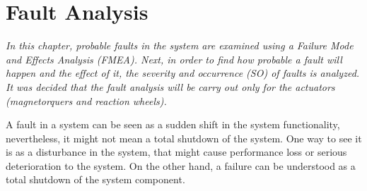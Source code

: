 \chapter{Fault  Analysis }
\textit{In this chapter, probable faults in the system are examined using a  Failure Mode and Effects Analysis (FMEA). Next, in order to find how probable a fault will happen and the effect of it, the severity and occurrence (SO)  of faults is analyzed. It was decided that the fault analysis will be carry out only for the actuators (magnetorquers and reaction wheels).}


A fault in a system can be seen as a sudden shift in the system functionality, nevertheless, it might not mean a total shutdown of the system. One way to see it is as a disturbance in the system, that might cause performance loss or serious deterioration to the system. On the other hand, a failure can be understood as a total shutdown of the system component. 


